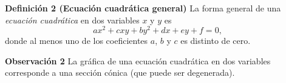 \begin{frame}%
	
	\begin{block}{\textbf{Definición 2 (Ecuación cuadrática general)}}
		\justifying
		La forma general de una \textit{ecuación cuadrática} en dos variables $x$ y $y$ es
		\[
			ax^2+cxy+by^2 + dx + ey + f= 0,
		\]
		donde al menos uno de los coeficientes $a$, $b$ y $c$ es distinto de cero.
	\end{block}
	
	\vspace{1mm}
	\begin{alertblock}{\textbf{Observación 2}}\justifying 
		La gráfica de una ecuación cuadrática en dos variables corresponde a una sección cónica (que puede ser degenerada).
	\end{alertblock}	


\end{frame}

